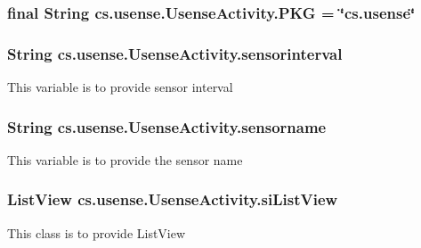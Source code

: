 \subsubsection[{P\+K\+G}]{\setlength{\rightskip}{0pt plus 5cm}final String cs.\+usense.\+Usense\+Activity.\+P\+K\+G = \char`\"{}cs.\+usense\char`\"{}\hspace{0.3cm}{\ttfamily [static]}}\label{classcs_1_1usense_1_1_usense_activity_aadee7e5d8c283dfae9005d3e2fd4fcd7}
\hypertarget{classcs_1_1usense_1_1_usense_activity_a6e91a30c9cc22d7e63b4c0cbe68b3ee1}{}
\subsubsection[{sensorinterval}]{\setlength{\rightskip}{0pt plus 5cm}String cs.\+usense.\+Usense\+Activity.\+sensorinterval\hspace{0.3cm}{\ttfamily [private]}}\label{classcs_1_1usense_1_1_usense_activity_a6e91a30c9cc22d7e63b4c0cbe68b3ee1}
This variable is to provide sensor interval \hypertarget{classcs_1_1usense_1_1_usense_activity_a2a4b08f436f712dc28f9be7b02bf62e4}{}
\subsubsection[{sensorname}]{\setlength{\rightskip}{0pt plus 5cm}String cs.\+usense.\+Usense\+Activity.\+sensorname\hspace{0.3cm}{\ttfamily [private]}}\label{classcs_1_1usense_1_1_usense_activity_a2a4b08f436f712dc28f9be7b02bf62e4}
This variable is to provide the sensor name \hypertarget{classcs_1_1usense_1_1_usense_activity_ad987a28aca979b8dddd792a94372ddae}{}
\subsubsection[{si\+List\+View}]{\setlength{\rightskip}{0pt plus 5cm}List\+View cs.\+usense.\+Usense\+Activity.\+si\+List\+View\hspace{0.3cm}{\ttfamily [private]}}\label{classcs_1_1usense_1_1_usense_activity_ad987a28aca979b8dddd792a94372ddae}
This class is to provide List\+View \hypertarget{classcs_1_1usense_1_1_usense_activity_a9a9e8dd0e952822c0ba0f4f210e7bc4c}{}
